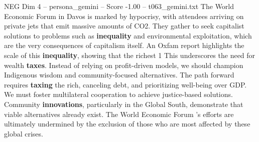 \begin{textsample}{NEG Dim 4 – persona\_gemini – Score -1.00 – t063\_gemini.txt}  \label{ex:f4_neg_004}
The World Economic Forum in Davos is marked by hypocrisy, with attendees arriving on private jets that emit massive amounts of CO2.
They gather to seek capitalist solutions to problems such as \textbf{inequality} and environmental exploitation, which are the very consequences of capitalism itself.
An Oxfam report highlights the scale of this \textbf{inequality}, showing that the richest 1 %
This underscores the need for wealth \textbf{taxes}.
Instead of relying on profit-driven models, we should champion Indigenous wisdom and community-focused alternatives.
The path forward requires \textbf{taxing} the rich, canceling debt, and prioritizing well-being over GDP.
We must foster multilateral cooperation to achieve justice-based solutions.
Community \textbf{innovations}, particularly in the Global South, demonstrate that viable alternatives already exist.
The World Economic Forum 's efforts are ultimately undermined by the exclusion of those who are most affected by these global crises.

\end{textsample}
